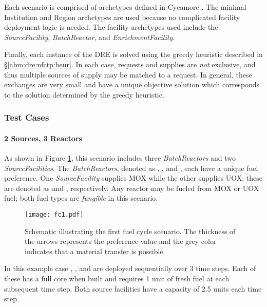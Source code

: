 Each scenario is comprised of archetypes defined in Cycamore
\cite{cycamore2013}. The minimal Institution and Region archetypes are used
because no complicated facility deployment logic is needed. The facility
archetypes used include the \textit{SourceFacility}, \textit{BatchReactor}, and
\textit{EnrichmentFacility}.

Finally, each instance of the DRE is solved using the greedy heuristic described
in \S \ref{abm:dre:nfctp:heur}. In each case, requests and supplies are
\textit{not} exclusive, and thus multiple sources of supply may be matched to a
request. In general, these exchanges are very small and have a unique objective
solution which corresponds to the solution determined by the greedy heuristic.

\subsubsection{Test Cases}\label{abm:dre:proof:cases}

\paragraph{2 Sources, 3 Reactors}

As shown in Figure \ref{fig::fc1}, this scenario includes three
\textit{BatchReactors} and two \textit{SourceFacilities}. The
\textit{BatchReactors}, denoted as , , and ,
each have a unique fuel preference. One \textit{SourceFacility} supplies MOX
while the other supplies UOX; these are denoted as \MOXSource{} and
\UOXSource{}, respectively. Any reactor may be fueled from MOX or UOX fuel; both
fuel types are \textit{fungible} in this scenario.

\begin{figure}
  \begin{center}
    \texttt{[image: fc1.pdf]}
    \caption[]{\label{fig::fc1} Schematic illustrating the first fuel cycle
      scenario. The thickness of the arrows represents the preference value and
      the grey color indicates that a material transfer is possible.}
  \end{center}
\end{figure}

In this example case , , and  are deployed
sequentially over 3 time steps. Each of these has a full core when built and
requires 1 unit of fresh fuel at each subsequent time step. Both source facilities
have a capacity of 2.5 units each time step.

